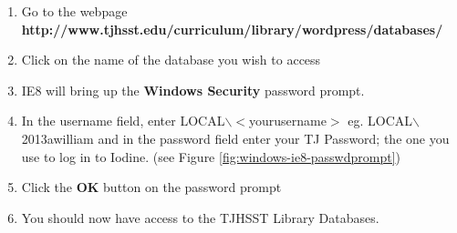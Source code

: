 \documentclass{article}
\newcommand{\librarydbpage}{http://www.tjhsst.edu/curriculum/library/wordpress/databases/}
\begin{document}
\begin{flushleft}
\begin{enumerate}
\item Go to the webpage \textbf{\librarydbpage}
\item Click on the name of the database you wish to access
\item IE8 will bring up the \textbf{Windows Security} password prompt.
\item In the username field, enter LOCAL$\backslash$$<$yourusername$>$ eg. LOCAL$\backslash$2013awilliam and in the password field enter your TJ Password; the one you use to log in to Iodine. (see Figure \ref{fig:windows-ie8-passwdprompt})
\item Click the \textbf{OK} button on the password prompt
\item You should now have access to the TJHSST Library Databases.
\end{enumerate}
\begin{figure}[H]
\centering
{}

\end{figure}
\end{flushleft}
\end{document}

